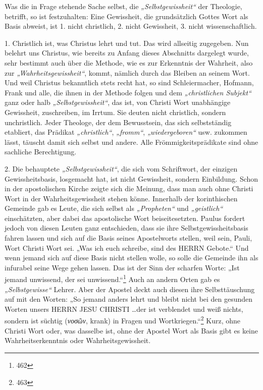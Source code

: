 Was die in Frage stehende Sache selbst, die \emph{„Selbstgewissheit“} der Theologie, betrifft, so ist festzuhalten: Eine Gewissheit, die grundsätzlich Gottes Wort als Basis abweist, ist 1. nicht christlich, 2. nicht Gewissheit, 3. nicht wissenschaftlich.

1. Christlich ist, was Christus lehrt und tut. Das wird allseitig zugegeben. Nun belehrt uns Christus, wie bereits zu Anfang dieses Abschnitts dargelegt wurde, sehr bestimmt auch über die Methode, wie es zur Erkenntnis der Wahrheit, also zur \emph{„Wahrheitsgewissheit“}, kommt, nämlich durch das Bleiben an seinem Wort. Und weil Christus bekanntlich stets recht hat, so sind Schleiermacher, Hofmann, Frank und alle, die ihnen in der Methode folgen und dem \emph{„christlichen Subjekt“} ganz oder halb \emph{„Selbstgewissheit“}, das ist, von Christi Wort unabhängige Gewissheit, zuschreiben, im Irrtum. Sie deuten nicht christlich, sondern unchristlich. Jeder Theologe, der dem Bewusstsein, das sich selbstständig etabliert, das Prädikat \emph{„christlich“}, \emph{„fromm“}, \emph{„wiedergeboren“} usw. zukommen lässt, täuscht damit sich selbst und andere. Alle Frömmigkeitsprädikate sind ohne sachliche Berechtigung.

2. Die behauptete \emph{„Selbstgewissheit“}, die sich vom Schriftwort, der einzigen Gewissheitsbasis, losgemacht hat, ist nicht Gewissheit, sondern Einbildung. Schon in der apostolischen Kirche zeigte sich die Meinung, dass man auch ohne Christi Wort in der Wahrheitsgewissheit stehen könne. Innerhalb der korinthischen Gemeinde gab es Leute, die sich selbst als \emph{„Propheten“} und \emph{„geistlich“} einschätzten, aber dabei das apostolische Wort beiseitesetzten. Paulus fordert jedoch von diesen Leuten ganz entschieden, dass sie ihre Selbstgewissheitsbasis fahren lassen und sich auf die Basis seines Apostelworts stellen, weil sein, Pauli, Wort Christi Wort sei. „Was ich euch schreibe, sind des HERRN Gebote.“ Und wenn jemand sich auf diese Basis nicht stellen wolle, so solle die Gemeinde ihn als infurabel seine Wege gehen lassen. Das ist der Sinn der scharfen Worte: „Ist jemand unwissend, der sei unwissend.“\footnote{462} Auch an andern Orten gab es \emph{„Selbstgewisse“} Lehrer. Aber der Apostel deckt auch diesen ihre Selbsttäuschung auf mit den Worten: „So jemand anders lehrt und bleibt nicht bei den gesunden Worten unsers HERRN JESU CHRISTI \dots der ist verblendet und weiß nichts, sondern ist süchtig (\emph{νοσῶν}, krank) in Fragen und Wortkriegen.“\footnote{463} Kurz, ohne Christi Wort oder, was dasselbe ist, ohne der Apostel Wort als Basis gibt es keine Wahrheitserkenntnis oder Wahrheitsgewissheit.